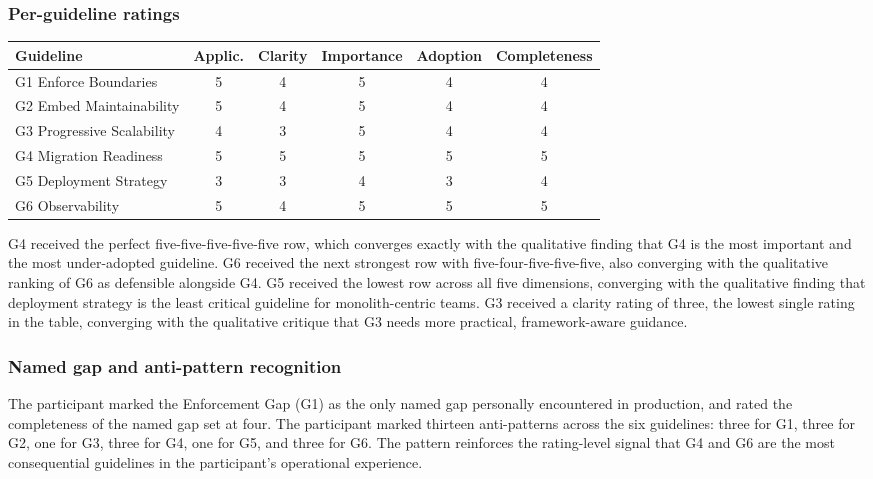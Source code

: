 \subsubsection*{Per-guideline ratings}

\begin{longtable}{p{2.5cm} c c c c c}
\toprule
\textbf{Guideline} & \textbf{Applic.} & \textbf{Clarity} & \textbf{Importance} & \textbf{Adoption} & \textbf{Completeness} \\
\midrule
\endhead
G1 Enforce Boundaries & 5 & 4 & 5 & 4 & 4 \\
G2 Embed Maintainability & 5 & 4 & 5 & 4 & 4 \\
G3 Progressive Scalability & 4 & 3 & 5 & 4 & 4 \\
G4 Migration Readiness & 5 & 5 & 5 & 5 & 5 \\
G5 Deployment Strategy & 3 & 3 & 4 & 3 & 4 \\
G6 Observability & 5 & 4 & 5 & 5 & 5 \\
\bottomrule
\end{longtable}

\noindent
G4 received the perfect five-five-five-five-five row, which converges exactly with the qualitative finding that G4 is the most important and the most under-adopted guideline. G6 received the next strongest row with five-four-five-five-five, also converging with the qualitative ranking of G6 as defensible alongside G4. G5 received the lowest row across all five dimensions, converging with the qualitative finding that deployment strategy is the least critical guideline for monolith-centric teams. G3 received a clarity rating of three, the lowest single rating in the table, converging with the qualitative critique that G3 needs more practical, framework-aware guidance.

\subsubsection*{Named gap and anti-pattern recognition}

The participant marked the Enforcement Gap (G1) as the only named gap personally encountered in production, and rated the completeness of the named gap set at four. The participant marked thirteen anti-patterns across the six guidelines: three for G1, three for G2, one for G3, three for G4, one for G5, and three for G6. The pattern reinforces the rating-level signal that G4 and G6 are the most consequential guidelines in the participant's operational experience.

